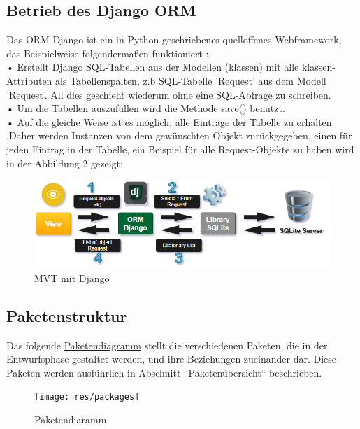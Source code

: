 \documentclass[parskip=full,11pt]{scrartcl}
\begin{document}
 \subsection{Betrieb des Django ORM} 
 
Das \gls{ORM} Django ist ein in Python geschriebenes quelloffenes Webframework, das Beispielweise folgendermaßen funktioniert :\\
 • Erstellt Django SQL-Tabellen aus der Modellen (klassen) mit alle klassen-Attributen als Tabellenspalten, z.b SQL-Tabelle 'Request' aus dem Modell 'Request'. All dies geschieht wiederum ohne eine SQL-Abfrage zu schreiben.\\
 • Um die Tabellen auszufüllen wird die Methode save() benutzt.\\
 • Auf die gleiche Weise ist es möglich, alle Einträge der Tabelle zu erhalten ,Daher werden Instanzen von dem gewünschten Objekt zurückgegeben, einen für jeden Eintrag in der Tabelle, ein Beispiel für alle Request-Objekte zu haben wird in der Abbildung 2 gezeigt:\\

  	\vspace{2cm}



\begin{figure}[ht!]
  	\includegraphics[width=1.05\textwidth]{res/MVTpart2.png}
  	 	\centering
  	    \caption{MVT mit Django}
 \end{figure}

 	

\newpage
 \subsection{Paketenstruktur}
 Das folgende \hyperref[packages]{Paketendiagramm} stellt die verschiedenen Paketen, die in der Entwurfsphase gestaltet werden, und ihre Beziehungen zueinander dar. Diese Paketen werden ausführlich in Abschnitt ``Paketenübersicht`` beschrieben.\\
 \begin{figure}[h]
 	\texttt{[image: res/packages]}
 	\centering
 	\caption{Paketendiaramm}
 	\label{packages}
 \end{figure}
 
\end{document}
